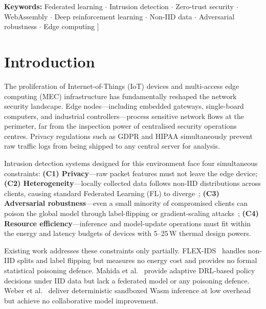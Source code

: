 \documentclass[11pt,a4paper,twocolumn]{article}
\theoremstyle{definition}
\begin{document}
{  \smallskip
  {\small\textbf{Keywords:} Federated learning $\cdot$ Intrusion
    detection $\cdot$ Zero-trust security $\cdot$ WebAssembly $\cdot$
    Deep reinforcement learning $\cdot$ Non-IID data $\cdot$
    Adversarial robustness $\cdot$ Edge computing}
  \vspace{10pt}
}]%

\section{Introduction}
\label{sec:intro}

The proliferation of Internet-of-Things (IoT) devices and multi-access edge
computing (MEC) infrastructure has fundamentally reshaped the network security
landscape.  Edge nodes---including embedded gateways, single-board computers,
and industrial controllers---process sensitive network flows at the perimeter,
far from the inspection power of centralised security operations centres.
Privacy regulations such as GDPR and HIPAA simultaneously prevent raw traffic
logs from being shipped to any central server for analysis.

Intrusion detection systems designed for this environment face four
simultaneous constraints:
\textbf{(C1) Privacy}---raw packet features must not leave the edge device;
\textbf{(C2) Heterogeneity}---locally collected data follows non-IID
distributions across clients, causing standard Federated Learning (FL) to
diverge~\cite{li2020fedprox};
\textbf{(C3) Adversarial robustness}---even a small minority of compromised
clients can poison the global model through label-flipping or gradient-scaling
attacks~\cite{tolpegin2020};
\textbf{(C4) Resource efficiency}---inference and model-update operations must
fit within the energy and latency budgets of devices with 5--25\,W thermal
design powers.

Existing work addresses these constraints only partially.
FLEX-IDS~\cite{flexids} handles non-IID splits and label flipping but
measures no energy cost and provides no formal statistical poisoning defence.
Mahida et al.~\cite{mahida2026} provide adaptive DRL-based policy decisions
under IID data but lack a federated model or any poisoning defence.
Weber et al.~\cite{weber2026} deliver deterministic sandboxed Wasm inference
at low overhead but achieve no collaborative model improvement.
\end{document}
